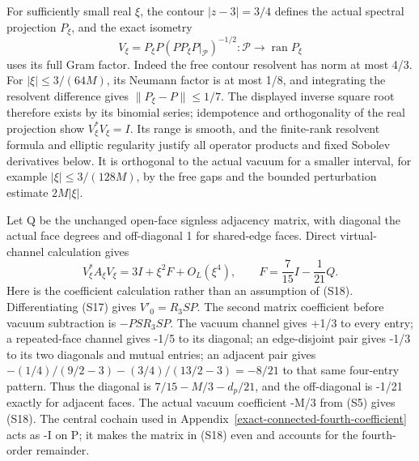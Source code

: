 For sufficiently small real \(\xi\), the contour \(|z-3|=3/4\) defines the actual spectral projection \(P_\xi\), and the exact isometry \[
 V_\xi=P_\xi P(PP_\xi P|_{\mathcal P})^{-1/2}
       :\mathcal P\longrightarrow\operatorname{ran}P_\xi
\tag{S17}
\] uses its full Gram factor. Indeed the free contour resolvent has norm at most 4/3. For \(|\xi|\le3/(64M)\), its Neumann factor is at most 1/8, and integrating the resolvent difference gives \(\|P_\xi-P\|\le1/7\). The displayed inverse square root therefore exists by its binomial series; idempotence and orthogonality of the real projection show \(V_\xi^*V_\xi=I\). Its range is smooth, and the finite-rank resolvent formula and elliptic regularity justify all operator products and fixed Sobolev derivatives below. It is orthogonal to the actual vacuum for a smaller interval, for example \(|\xi|\le3/(128M)\), by the free gaps and the bounded perturbation estimate \(2M|\xi|\).

Let Q be the unchanged open-face signless adjacency matrix, with diagonal the actual face degrees and off-diagonal 1 for shared-edge faces. Direct virtual-channel calculation gives \[
 V_\xi^*A_\xi V_\xi=3I+\xi^2F+O_L(\xi^4),\qquad
 F=\frac7{15}I-\frac1{21}Q.
\tag{S18}
\] Here is the coefficient calculation rather than an assumption of (S18). Differentiating (S17) gives \(V'_0=R_3SP\). The second matrix coefficient before vacuum subtraction is \(-PSR_3SP\). The vacuum channel gives +1/3 to every entry; a repeated-face channel gives -1/5 to its diagonal; an edge-disjoint pair gives -1/3 to its two diagonals and mutual entries; an adjacent pair gives \(- (1/4)/(9/2-3)-(3/4)/(13/2-3)=-8/21\) to that same four-entry pattern. Thus the diagonal is \(7/15-M/3-d_p/21\), and the off-diagonal is -1/21 exactly for adjacent faces. The actual vacuum coefficient -M/3 from (S5) gives (S18). The central cochain used in Appendix~\ref{exact-connected-fourth-coefficient} acts as -I on P; it makes the matrix in (S18) even and accounts for the fourth-order remainder.

